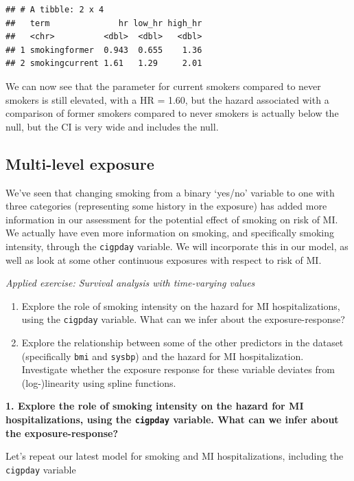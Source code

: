\documentclass[
]{book}
\providecommand{\tightlist}{%
  \setlength{\itemsep}{0pt}\setlength{\parskip}{0pt}}
\begin{document}
\begin{verbatim}
## # A tibble: 2 x 4
##   term              hr low_hr high_hr
##   <chr>          <dbl>  <dbl>   <dbl>
## 1 smokingformer  0.943  0.655    1.36
## 2 smokingcurrent 1.61   1.29     2.01
\end{verbatim}

We can now see that the parameter for current smokers compared to never smokers is still elevated, with a HR = 1.60, but the hazard associated with a comparison of former smokers compared to never smokers is actually below the null, but the CI is very wide and includes the null.

\subsection{Multi-level exposure}\label{multi-level-exposure}

We've seen that changing smoking from a binary `yes/no' variable to one with three categories (representing some history in the exposure) has added more information in our assessment for the potential effect of smoking on risk of MI. We actually have even more information on smoking, and specifically smoking intensity, through the \texttt{cigpday} variable. We will incorporate this in our model, as well as look at some other continuous exposures with respect to risk of MI.

\emph{Applied exercise: Survival analysis with time-varying values}

\begin{enumerate}
\def\labelenumi{\arabic{enumi}.}
\tightlist
\item
  Explore the role of smoking intensity on the hazard for MI hospitalizations, using the \texttt{cigpday} variable. What can we infer about the exposure-response?
\item
  Explore the relationship between some of the other predictors in the dataset (specifically \texttt{bmi} and \texttt{sysbp}) and the hazard for MI hospitalization. Investigate whether the exposure response for these variable deviates from (log-)linearity using spline functions.
\end{enumerate}

\textbf{1. Explore the role of smoking intensity on the hazard for MI hospitalizations, using the \texttt{cigpday} variable. What can we infer about the exposure-response?}

Let's repeat our latest model for smoking and MI hospitalizations, including the \texttt{cigpday} variable
\end{document}
